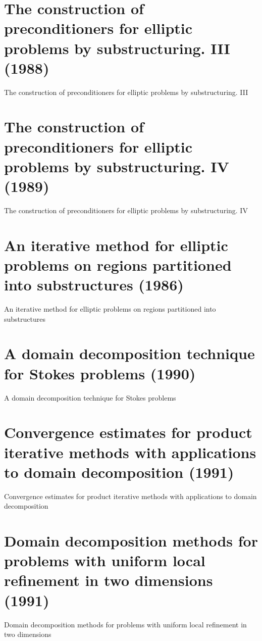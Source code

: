 \section{The construction of preconditioners for elliptic problems by substructuring. III (1988)}
The construction of preconditioners for elliptic problems by substructuring. III \cite{bramble1988construction}


\section{The construction of preconditioners for elliptic problems by substructuring. IV (1989)}
The construction of preconditioners for elliptic problems by substructuring. IV \cite{bramble1989construction}


\section{An iterative method for elliptic problems on regions partitioned into substructures (1986)}
An iterative method for elliptic problems on regions partitioned into substructures \cite{bramble1986construction}


\section{A domain decomposition technique for Stokes problems (1990)}
A domain decomposition technique for Stokes problems \cite{bramble1990domain}


\section{Convergence estimates for product iterative methods with applications to domain decomposition (1991)}
Convergence estimates for product iterative methods with applications to domain decomposition \cite{bramble1991convergence-b}


\section{Domain decomposition methods for problems with uniform local refinement in two dimensions (1991)}
Domain decomposition methods for problems with uniform local refinement in two dimensions \cite{bramble1991domain}


